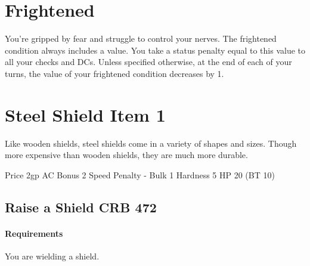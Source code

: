 \documentclass[paper=a7, DIV=15, fontsize=8pt]{scrartcl}
\begin{document}
\pagestyle{empty}



\setlength\parindent{0pt} %
\setlength\parskip{4pt} %


\renewcommand*{\sectionformat}{}
\renewcommand*{\subsectionformat}{}

\newcommand{\Item}[2]{\section{#2 \hfill Item #1}}
\newcommand{\Action}[4]{\subsection[#4]{#4 \ActionSymbol{#3} \hfill {\normalfont \small #1 #2}}}

\newcommand{\Requirements}[1]{\paragraph{Requirements} #1.}
\newcommand{\WeaponDamage}[1]{\textbf{Damage} #1}
\newcommand{\ItemHands}[1]{\textbf{Hands} #1}
\newcommand{\WeaponType}[1]{\textbf{Type} #1}
\newcommand{\WeaponCategory}[1]{\textbf{Category} #1}
\newcommand{\WeaponGroup}[1]{\textbf{Group} #1}

\newcommand{\Reference}[2]{{\small #1 #2}}


\section{Frightened}

You're gripped by fear and struggle to control your nerves.
The frightened condition always includes a value.
You take a status penalty equal to this value to all your checks and DCs.
Unless specified otherwise, at the end of each of your turns, the value of your frightened condition decreases by 1.

\Item{1}{Steel Shield}

Like wooden shields, steel shields come in a variety of shapes and sizes. Though more expensive than wooden shields, they are much more durable.

Price 2gp
AC Bonus 2
Speed Penalty -
Bulk 1
Hardness 5
HP 20 (BT 10)

\Action{CRB}{472}{1}{Raise a Shield}

\Requirements{You are wielding a shield}
\end{document}
